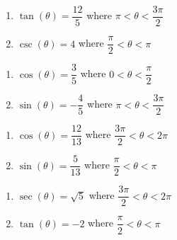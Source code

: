 \begin{multicols}{2}

\begin{enumerate}

\setcounter{enumi}{\value{HW}}

\item $\tan(\theta) = \dfrac{12}{5}$ where $\pi < \theta < \dfrac{3\pi}{2}$
\item $\csc(\theta) = 4$ where $\dfrac{\pi}{2} < \theta < \pi$

\setcounter{HW}{\value{enumi}}

\end{enumerate}

\end{multicols}

\begin{multicols}{2}

\begin{enumerate}

\setcounter{enumi}{\value{HW}}

\item  $\cos(\theta) = \dfrac{3}{5}$ where $0 < \theta < \dfrac{\pi}{2}$
\item  $\sin(\theta) = -\dfrac{4}{5}$ where $\pi < \theta < \dfrac{3\pi}{2}$

\setcounter{HW}{\value{enumi}}

\end{enumerate}

\end{multicols}

\begin{multicols}{2}

\begin{enumerate}

\setcounter{enumi}{\value{HW}}

\item  $\cos(\theta) = \dfrac{12}{13}$ where $\dfrac{3\pi}{2} < \theta < 2\pi$
\item  $\sin(\theta) = \dfrac{5}{13}$ where $\dfrac{\pi}{2} < \theta < \pi$

\setcounter{HW}{\value{enumi}}

\end{enumerate}

\end{multicols}

\begin{multicols}{2}

\begin{enumerate}

\setcounter{enumi}{\value{HW}}

\item  $\sec(\theta) = \sqrt{5}$ where $\dfrac{3\pi}{2} < \theta < 2\pi$
\item  $\tan(\theta) = -2$ where $\dfrac{\pi}{2} < \theta < \pi$ \label{doublehalflast}

\setcounter{HW}{\value{enumi}}

\end{enumerate}

\end{multicols}

